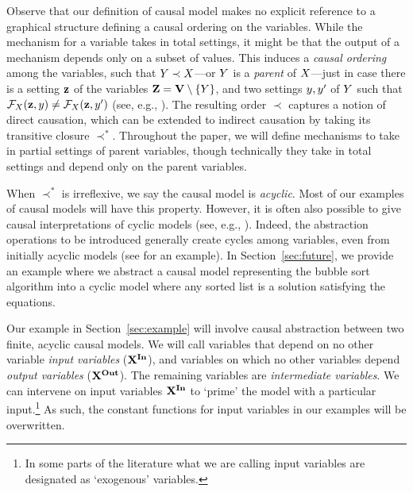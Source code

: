 \documentclass[twoside,11pt]{article}
\begin{document}
\begin{remark}\label{rem:graph}
Observe that our definition of causal model makes no explicit reference to a graphical structure defining a causal ordering on the variables. While the mechanism for a variable takes in total settings, it might be that the output of a mechanism depends only on a subset of values. This induces a \textit{causal ordering} among the variables, such that $Y \prec X$---or $Y$ is a \emph{parent} of $X$---just in case there is a setting $\mathbf{z}$ of the variables $\mathbf{Z} = \mathbf{V}\setminus\{Y\}$, and two settings $y,y'$ of $Y$ such that $\mathcal{F}_{X}(\mathbf{z},y) \neq \mathcal{F}_{X}(\mathbf{z},y')$ (see, e.g., \citealt{Woodward2003}). The resulting order $\prec$ captures a notion of direct causation, which can be extended to indirect causation by taking its transitive closure $\prec^*$. Throughout the paper, we will define mechanisms to take in partial settings of parent variables, though technically they take in total settings and depend only on the parent variables.
\end{remark}

When $\prec^*$ is irreflexive, we say the causal model is \textit{acyclic}. Most of our examples of causal models will have this property. However, it is often also possible to give causal interpretations of cyclic models (see, e.g., \citealt{Bongers}). Indeed, the abstraction operations to be introduced generally create cycles among variables, even from initially acyclic models (see \citealt[\S 5.3]{Rubinstein2017} for an example). In Section~\ref{sec:future}, we provide an example where we abstract a causal model representing the bubble sort algorithm into a cyclic model where any sorted list is a solution satisfying the equations. 

\begin{remark}\label{rem:acyc}
Our example in Section~\ref{sec:example} will involve causal abstraction  between two finite, acyclic causal models. We will call variables that depend on no other variable \textit{input variables} ($\mathbf{X}^{\mathbf{In}}$), and variables on which no other variables depend \textit{output variables} ($ \mathbf{X}^{\mathbf{Out}}$). The remaining variables are \textit{intermediate variables}. We can intervene on input variables $\mathbf{X}^{\mathbf{In}}$ to `prime' the model with a particular input.\footnote{In some parts of the literature what we are calling input variables are designated as `exogenous' variables.}  As such, the constant functions for input variables in our examples will be overwritten.
\end{remark}
\end{document}
